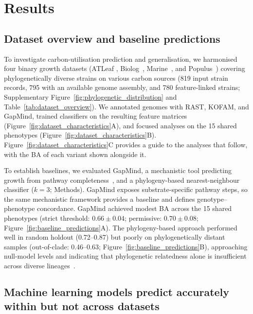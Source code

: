 
\section*{Results}

\subsection*{Dataset overview and baseline predictions}

To investigate carbon-utilisation prediction and generalisation, we harmonised four binary growth datasets (ATLeaf \cite{Schafer2023-nk}, Biolog~\cite{BiologDatasetCitation}, Marine~\cite{Gralka2023-ft}, and Populus~\cite{PopulusDatasetCitation}) covering phylogenetically diverse strains on various carbon sources (819 input strain records, 795 with an available genome assembly, and 780 feature-linked strains; Supplementary Figure~\ref{fig:phylogenetic_distribution} and Table~\ref{tab:dataset_overview}).
We annotated genomes with RAST, KOFAM, and GapMind, trained classifiers on the resulting feature matrices (Figure~\ref{fig:dataset_characteristics}A), and focused analyses on the 15 shared phenotypes (Figure~\ref{fig:dataset_characteristics}B).
Figure~\ref{fig:dataset_characteristics}C provides a guide to the analyses that follow, with the BA of each variant shown alongside it.


To establish baselines, we evaluated GapMind, a mechanistic tool predicting growth from pathway completeness~\cite{Price2022GapMindCarbon,Price2020GapMind,Price2024Improving}, and a phylogeny-based nearest-neighbour classifier ($k=3$; Methods).
GapMind exposes substrate-specific pathway steps, so the same mechanistic framework provides a baseline and defines genotype--phenotype concordance.
GapMind achieved modest BA across the 15 shared phenotypes (strict threshold: $0.66 \pm 0.04$; permissive: $0.70 \pm 0.08$; Figure~\ref{fig:baseline_predictions}A).
The phylogeny-based approach performed well in random holdout (0.72--0.87) but poorly on phylogenetically distant samples (out-of-clade: 0.46--0.63; Figure~\ref{fig:baseline_predictions}B), approaching null-model levels and indicating that phylogenetic relatedness alone is insufficient across diverse lineages~\cite{Langille2013-fh,Martiny2013-ob,Michener2014Phylogeny,Goberna2016Predicting,CaroQuintero2015HGT}.


\FloatBarrier{}

\subsection*{Machine learning models predict accurately within but not across datasets}

